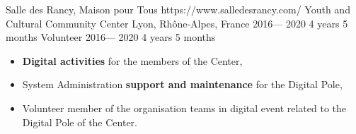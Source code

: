 \volunteerorganization%
{Salle des Rancy, Maison pour Tous}%
{https://www.salledesrancy.com/}%
{Youth and Cultural Community Center}%
{Lyon, Rhône-Alpes, France}%
{2016--- 2020}%
{4 years 5 months}%
\volunteerposition%
{Volunteer}%
{2016--- 2020}%
{4 years 5 months}%
{
	\begin{itemize}
		\item \textbf{Digital activities} for the members of the Center,
		\item System Administration \textbf{support and maintenance} for the Digital Pole,
		\item Volunteer member of the organisation teams in digital event related to
		  the Digital Pole of the Center.
	\end{itemize}
}%
